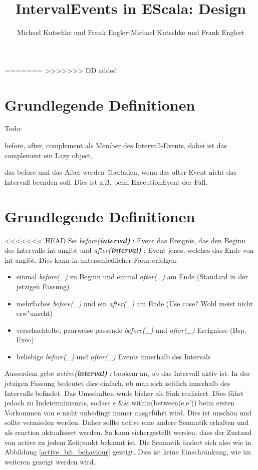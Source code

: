 \documentclass[article,colorback,accentcolor=tud4c]{tudreport}
\title{IntervalEvents in EScala: Design}
\subtitle{Michael Kutschke und Frank Englert}
\subtitle{Michael Kutschke und Frank Englert}
\newcommand{\before}[1]{\textit{ before(#1) }}
\newcommand{\after}[1]{\textit{after(#1)}}
\newcommand{\aktiv}[1]{\textit{active(#1)}}
\newcommand{\Interval}[1]{\textbf{interval#1}}
\begin{document}
=======
>>>>>>> DD added
\maketitle

\tableofcontents

\section{Grundlegende Definitionen}
Todo:

before, after, complement als Member des Intervall-Events, dabei ist das complement ein Lazy object,

das before und das After werden überladen, wenn das after-Event nicht das Intervall beenden soll. Dies ist z.B. beim ExecutionEvent der Fall.

\section{Grundlegende Definitionen}
<<<<<<< HEAD
Sei \before{\Interval} : Event das Ereignis, das den Beginn des Intervalls int angibt
und \after{\Interval} : Event jenes, welches das Ende von int angibt. Dies kann in
unterschiedlicher Form erfolgen:
\begin{itemize}
\item einmal \before{\_} zu Beginn und einmal \after{\_} am Ende (Standard in der jetzigen Fassung)
\item mehrfaches \before{\_} und ein \after{\_} am Ende (Use case? Wohl meist nicht erw"unscht)
\item verschachtelte, paarweise passende \before{\_} und \after{\_} Ereignisse (Bsp. Exec)
\item beliebige \before{\_} und \after{\_} Events innerhalb des Intervals
\end{itemize}
Ausserdem gebe \aktiv\Interval{} : boolean an, ob das Intervall aktiv ist.
In der jetzigen Fassung bedeutet dies einfach, ob man sich zeitlich innerhalb des
Intervalls befindet. Das Umschalten wude bisher als Sink realisiert. Dies führt
jedoch zu Indeterminismus, sodass e \&\& within(between(e,e')) beim ersten Vorkommen 
von e nicht unbedingt immer ausgeführt wird. Dies ist unschön und sollte vermieden werden.
Daher sollte active eine andere Semantik erhalten und als reaction aktualisiert
werden. So kann sichergestellt werden, dass der Zustand von active zu jedem
Zeitpunkt bekannt ist. Die Semantik ändert sich also wie in Abbildung
\ref{active_bit_behaviour} gezeigt. Dies ist keine Einschränkung, wie im
weiteren gezeigt werden wird.
\end{document}
